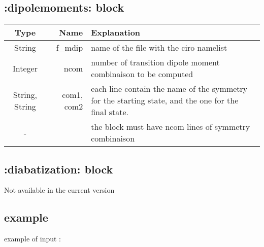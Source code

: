\documentclass[a4paper,10pt]{article}
\begin{document}
\subsection{:dipolemoments: block}
\begin{tabular}{|crp{110mm}|}         \hline
\bf{Type} & \bf{Name} & \hspace{4cm}\bf{Explanation}\\ \hline
String & f\_mdip & name of the file with the ciro namelist\\\hline
Integer & ncom & number of transition dipole moment combinaison to be computed\\ \hline
String, String & com1, com2 & each line contain the name of the symmetry for the starting state, and the one for the final state.\\ \hline
- & & the block must have ncom lines of symmetry combinaison\\ \hline
\end{tabular}

\subsection{:diabatization: block}

Not available in the current version

\subsection{example}

example of input :\\
\end{document}
